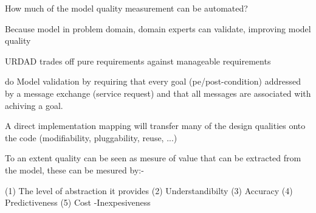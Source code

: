 How much of the model quality measurement can be automated?

Because model in problem domain, domain experts can validate, improving model quality

URDAD trades off pure requirements against manageable requirements

\cite{graham_requirements_2008} do Model validation by requiring that every goal (pe/post-condition) addressed by a message exchange (service request) and that all messages are associated with achiving a goal.

A direct implementation mapping will transfer many of the design qualities onto the code (modifiability, pluggability, reuse, ...)

To an extent quality can be seen as mesure of value that can be extracted from the model, these can be mesured by:-

(1) The level of abstraction it provides
(2) Understandibilty 
(3) Accuracy 
(4) Predictiveness
(5) Cost -Inexpesiveness 
\cite{selic_pragmatic_mdd_20003}

